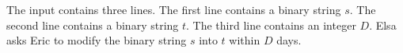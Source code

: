The input contains three lines.
The first line contains a binary string $s$.
The second line contains a binary string $t$.
The third line contains an integer $D$.
Elsa asks Eric to modify the binary string $s$ into $t$ within $D$ days.
